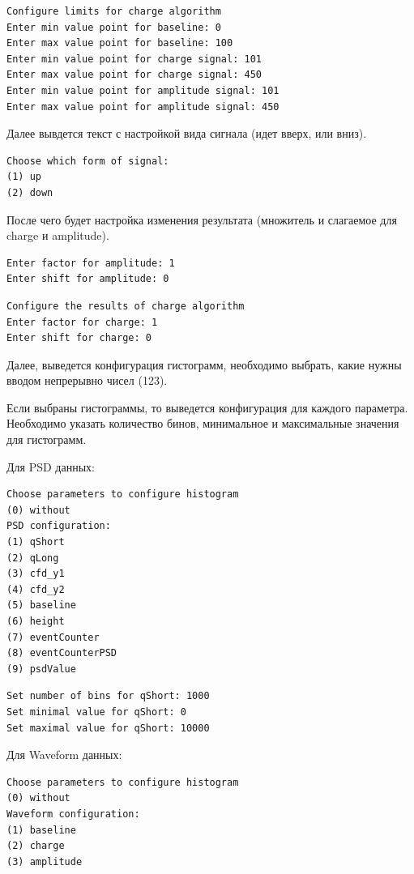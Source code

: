 \documentclass[12pt,a4paper,openany]{article}
\begin{document}
\begin{lstlisting}
Configure limits for charge algorithm
Enter min value point for baseline: 0
Enter max value point for baseline: 100
Enter min value point for charge signal: 101
Enter max value point for charge signal: 450
Enter min value point for amplitude signal: 101
Enter max value point for amplitude signal: 450
\end{lstlisting}

Далее вывдется текст с настройкой вида сигнала (идет вверх, или вниз).

\begin{lstlisting}
Choose which form of signal:
(1) up
(2) down
\end{lstlisting}

После чего будет настройка изменения результата (множитель и слагаемое для
charge и amplitude).

\begin{lstlisting}
Enter factor for amplitude: 1
Enter shift for amplitude: 0
\end{lstlisting}

\begin{lstlisting}
Configure the results of charge algorithm
Enter factor for charge: 1
Enter shift for charge: 0
\end{lstlisting}

Далее, выведется конфигурация гистограмм, необходимо выбрать, какие
нужны вводом непрерывно чисел (123). 

Если выбраны гистограммы, то выведется конфигурация для каждого параметра. Необходимо указать количество бинов, минимальное и максимальные значения для
гистограмм.

Для PSD данных:
\begin{lstlisting}
Choose parameters to configure histogram
(0) without
PSD configuration:
(1) qShort
(2) qLong
(3) cfd_y1
(4) cfd_y2
(5) baseline
(6) height
(7) eventCounter
(8) eventCounterPSD
(9) psdValue
\end{lstlisting}

\begin{lstlisting}
Set number of bins for qShort: 1000
Set minimal value for qShort: 0
Set maximal value for qShort: 10000 
\end{lstlisting}

Для Waveform данных:
\begin{lstlisting}
Choose parameters to configure histogram
(0) without
Waveform configuration:
(1) baseline
(2) charge
(3) amplitude
\end{lstlisting}
\end{document}
